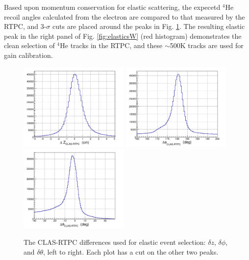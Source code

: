 \documentclass[amsmath,amssymb,notitlepage,12pt]{revtex4-1}
\begin{document}
Based upon momentum conservation for elastic scattering, the expecetd $^4$He recoil angles calculated from the electron are compared to that measured by the RTPC, and 3-$\sigma$ cuts are placed around the peaks in Fig. \ref{fig:elastics}. 
The resulting elastic peak in the right panel of Fig. \ref{fig:elasticsW} (red histogram) demonstrates the clean selection of $^4$He tracks in the RTPC, and these $\sim$500K tracks are used for gain calibration.%
\begin{figure}[htbp]\centering
    \includegraphics[width=5.4cm]{dzQ.png}
    \includegraphics[width=5.4cm]{dphiQ.png}
    \includegraphics[width=5.4cm]{dtheQ.png}
    \caption{\label{fig:elastics}The CLAS-RTPC differences used for elastic event selection: $\delta z$, $\delta \phi$, and $\delta \theta$, left to right.  Each plot has a cut on the other two peaks.}%
\end{figure}
\end{document}
